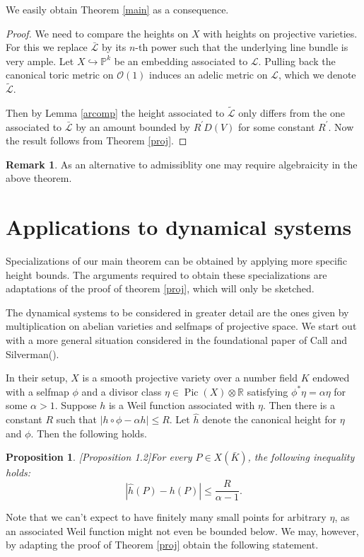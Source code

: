 \documentclass[11pt, a4paper, UKenglish]{amsart}
\renewcommand{\O}{\mathcal O}
\newcommand{\sL}{\mathcal{L}}
\newcommand{\bbP}{\mathbb{P}}
\newcommand{\bbR}{\mathbb{R}}
\newcommand{\into}{\hookrightarrow}
\DeclareMathOperator{\Pic}{Pic}
\newcommand{\eqn}[1]{\begin{equation*}#1\end{equation*}}
\newtheorem{prop_}[thm_]{Proposition}
\theoremstyle{definition}
\newtheorem{rk_}[thm_]{Remark}
\newcommand{\prop}[1]{\begin{prop_}#1\end{prop_}}
\newcommand{\rk}[1]{\begin{rk_}#1\end{rk_}}
\newcommand{\pf}[1]{\begin{proof}#1\end{proof}}
\begin{document}
We easily obtain Theorem \ref{main} as a consequence.

\main*

\pf{We need to compare the heights on $X$ with heights on projective varieties. For this we replace $\bar{\sL}$ by its $n$-th power such that the underlying line bundle is very ample. Let $X \into \bbP^k$ be an embedding associated to $\sL$. Pulling back the canonical toric metric on $\O(1)$ induces an adelic metric on $\sL$, which we denote $\tilde{\sL}$.

Then by Lemma \ref{arcomp} the height associated to $\tilde{\sL}$ only differs from the one associated to $\bar{\sL}$ by an amount bounded by $R^\prime D(V)$ for some constant $R^\prime$. Now the result follows from Theorem \ref{proj}.}

\rk{As an alternative to admissiblity one may require algebraicity in the above theorem.}


\section{Applications to dynamical systems}

Specializations of our main theorem can be obtained by applying more specific height bounds. The arguments required to obtain these specializations are adaptations of the proof of theorem \ref{proj}, which will only be sketched.

The dynamical systems to be considered in greater detail are the ones given by multiplication on abelian varieties and selfmaps of projective space. We start out with a more general situation considered in the foundational paper of Call and Silverman(\cite{canonical}).

In their setup, $X$ is a smooth projective variety over a number field $K$ endowed with a selfmap $\phi$ and a divisor class $\eta \in \Pic(X) \otimes \bbR$ satisfying $\phi^* \eta = \alpha \eta$ for some $\alpha > 1$. Suppose $h$ is a Weil function associated with $\eta.$ Then there is a constant $R$ such that $|h \circ \phi - \alpha h| \leq R$. Let $\hat{h}$ denote the canonical height for $\eta$ and $\phi$. Then the following holds.

\prop{\label{canonical}[\cite{canonical}Proposition 1.2]For every $P \in X(\bar{K})$, the following inequality holds:
\eqn{|\hat{h}(P) - h(P)| \leq \frac{R}{\alpha - 1}.}
}

Note that we can't expect to have finitely many small points for arbitrary $\eta$, as an associated Weil function might not even be bounded below. We may, however, by adapting the proof of Theorem \ref{proj} obtain the following statement.
\end{document}
